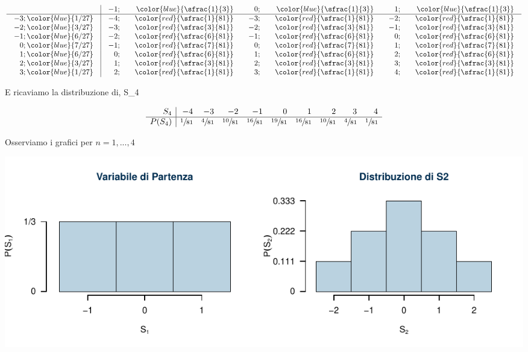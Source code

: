 \documentclass[
  11pt,
]{book}
\theoremstyle{mytheoremstyle}
\theoremstyle{mydefstyle}
\begin{document}
\[\arraycolsep=10pt\def\arraystretch{1}\begin{array}{ r|rrrrrr }
& -1 ;&\color{blue}{ \sfrac{ 1 } { 3 }} & 0 ;&\color{blue}{ \sfrac{ 1 } { 3 }} & 1 ;&\color{blue}{ \sfrac{ 1 } { 3 }} \\ 
\hline 
-3 ;\color{blue}{ 1 / 27 }& -4;&\color{red}{\sfrac{1}{81}}& -3;&\color{red}{\sfrac{1}{81}}& -2;&\color{red}{\sfrac{1}{81}}\\ 
-2 ;\color{blue}{ 3 / 27 }& -3;&\color{red}{\sfrac{3}{81}}& -2;&\color{red}{\sfrac{3}{81}}& -1;&\color{red}{\sfrac{3}{81}}\\ 
-1 ;\color{blue}{ 6 / 27 }& -2;&\color{red}{\sfrac{6}{81}}& -1;&\color{red}{\sfrac{6}{81}}& 0;&\color{red}{\sfrac{6}{81}}\\ 
0 ;\color{blue}{ 7 / 27 }& -1;&\color{red}{\sfrac{7}{81}}& 0;&\color{red}{\sfrac{7}{81}}& 1;&\color{red}{\sfrac{7}{81}}\\ 
1 ;\color{blue}{ 6 / 27 }& 0;&\color{red}{\sfrac{6}{81}}& 1;&\color{red}{\sfrac{6}{81}}& 2;&\color{red}{\sfrac{6}{81}}\\ 
2 ;\color{blue}{ 3 / 27 }& 1;&\color{red}{\sfrac{3}{81}}& 2;&\color{red}{\sfrac{3}{81}}& 3;&\color{red}{\sfrac{3}{81}}\\ 
3 ;\color{blue}{ 1 / 27 }& 2;&\color{red}{\sfrac{1}{81}}& 3;&\color{red}{\sfrac{1}{81}}& 4;&\color{red}{\sfrac{1}{81}}\\ 
\end{array}
 \]

\normalsize E ricaviamo la distribuzione di, S\_4

\normalsize

\[
     \begin{array}{ r|rrrrrrrrr }
 S_4  & -4& -3& -2& -1& 0& 1& 2& 3& 4 \\ 
 \hline 
 P( S_4 ) & \sfrac{1}{81}& \sfrac{4}{81}& \sfrac{10}{81}& \sfrac{16}{81}& \sfrac{19}{81}& \sfrac{16}{81}& \sfrac{10}{81}& \sfrac{4}{81}& \sfrac{1}{81} \\ 
 \end{array}
 \]

Osserviamo i grafici per \(n=1,...,4\)

\begin{center}\includegraphics{Appunti_di_Statistica_2025_files/figure-latex/08-tlc-7-1} \end{center}
\end{document}
